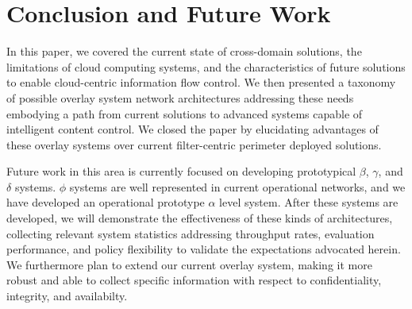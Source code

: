 \documentclass{sig-alternate}
\begin{document}





\section{Conclusion and Future Work}
In this paper, we covered the current state of cross-domain solutions, the limitations of cloud computing systems, and the characteristics of future solutions to enable cloud-centric information flow control.  We then presented a taxonomy of possible overlay system network architectures addressing these needs embodying a path from current solutions to advanced systems capable of intelligent content control.  We closed the paper by elucidating advantages of these overlay systems over current filter-centric perimeter deployed solutions.

Future work in this area is currently focused on developing prototypical $\beta$, $\gamma$, and $\delta$ systems.  $\phi$ systems are well represented in current operational networks, and we have developed an operational prototype $\alpha$ level system.  After these systems are developed, we will demonstrate the effectiveness of these kinds of architectures, collecting relevant system statistics addressing throughput rates, evaluation performance, and policy flexibility to validate the expectations advocated herein.  We furthermore plan to extend our current overlay system, making it more robust and able to collect specific information with respect to confidentiality, integrity, and availabilty.



\end{document}
